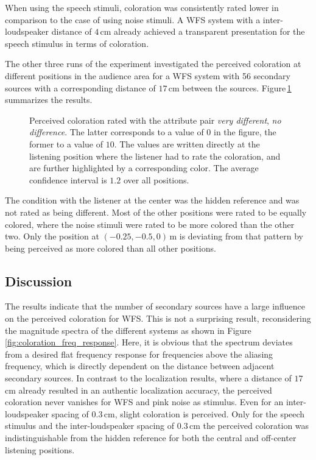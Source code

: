 When using the speech stimuli, coloration was consistently rated lower in comparison
to the case of using noise stimuli. A \ac{WFS} system with a inter-loudspeaker
distance of $4$\,cm already achieved a transparent presentation for the speech
stimulus in terms of coloration. 

The other three runs of the experiment investigated the perceived
coloration at different positions in the audience area for a \ac{WFS} system
with 56 secondary sources with a corresponding distance
of $17$\,cm between the sources. Figure\,\ref{fig:wfs_coloration_pos} summarizes
the results.
%
\begin{figure}
    \small
    \centering
    
    \caption{Perceived coloration rated with the attribute pair \emph{very
    different}, \emph{no difference}. The latter corresponds to a value of $0$ in
    the figure, the former to a value of $10$. The values are written directly at
    the listening position where the listener had to rate the coloration, and are
    further highlighted by a corresponding color. The average confidence
    interval is $1.2$ over all positions.
    }
    \label{fig:wfs_coloration_pos}
\end{figure}
%
The condition with the listener at the center was the hidden reference and was
not rated as being different. Most of the other positions were rated to be
equally colored, where the noise stimuli were rated to be more colored than the
other two.
Only the position at $(-0.25,-0.5,0)$\,m is
deviating from that pattern by being perceived as more colored than all other
positions.



\subsection{Discussion}
\label{sec:wfs_coloration_discussion}
%
The results indicate that the number of secondary sources have a large influence
on the perceived coloration for \ac{WFS}. This is not a surprising result,
reconsidering the magnitude spectra of the different systems as shown in
Figure\,\ref{fig:coloration_freq_response}. Here, it is obvious that the spectrum
deviates from a desired flat frequency response for frequencies above the aliasing
frequency, which is directly dependent on the distance between adjacent secondary
sources.
In contrast to the localization results, where a distance of $17$\,cm already resulted
in an authentic localization accuracy, the perceived coloration never
vanishes for \ac{WFS} and pink noise as stimulus. Even for an inter-loudspeaker
spacing of $0.3$\,cm, slight coloration is perceived. 
Only for the speech stimulus and the inter-loudspeaker spacing of $0.3$\,cm the perceived
coloration was indistinguishable from the hidden reference for both the central
and off-center listening positions.

